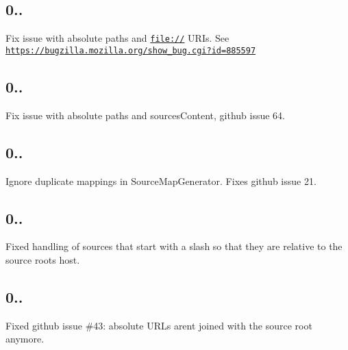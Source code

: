 \subsection*{0..}


\begin{DoxyItemize}
\item Fix issue with absolute paths and {\ttfamily \href{file://}{\tt file\+://}} U\+R\+Is. See \href{https://bugzilla.mozilla.org/show_bug.cgi?id=885597}{\tt https\+://bugzilla.\+mozilla.\+org/show\+\_\+bug.\+cgi?id=885597}
\end{DoxyItemize}

\subsection*{0..}


\begin{DoxyItemize}
\item Fix issue with absolute paths and sources\+Content, github issue 64.
\end{DoxyItemize}

\subsection*{0..}


\begin{DoxyItemize}
\item Ignore duplicate mappings in Source\+Map\+Generator. Fixes github issue 21.
\end{DoxyItemize}

\subsection*{0..}


\begin{DoxyItemize}
\item Fixed handling of sources that start with a slash so that they are relative to the source root\textquotesingle{}s host.
\end{DoxyItemize}

\subsection*{0..}


\begin{DoxyItemize}
\item Fixed github issue \#43\+: absolute U\+R\+Ls aren\textquotesingle{}t joined with the source root anymore.
\end{DoxyItemize}

